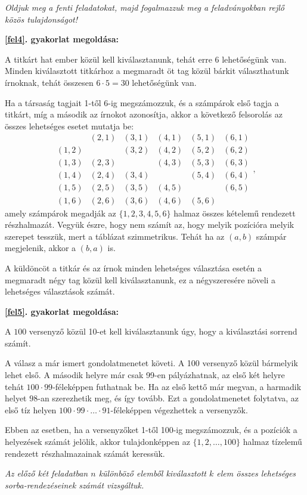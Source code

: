 \textit{Oldjuk meg a fenti feladatokat, majd fogalmazzuk meg a feladványokban
rejlő közös tulajdonságot!}
\begin{solution}
{\bf\ref{fel4}. gyakorlat megoldása:}

A titkárt hat ember közül kell kiválasztanunk, tehát erre 6 lehetőségünk
van. Minden kiválasztott titkárhoz a megmaradt öt tag közül bárkit
választhatunk írnoknak, tehát összesen $6\cdot5=30$ lehetőségünk
van.

Ha a társaság tagjait 1-től 6-ig megszámozzuk, és a számpárok első
tagja a titkárt, míg a második az írnokot azonosítja, akkor a következő
felsorolás az összes lehetséges esetet mutatja be: 
\[
\begin{array}{cccccc}
 & (2,1) & (3,1) & (4,1) & (5,1) & (6,1)\\
(1,2) &  & (3,2) & (4,2) & (5,2) & (6,2)\\
(1,3) & (2,3) &  & (4,3) & (5,3) & (6,3)\\
(1,4) & (2,4) & (3,4) &  & (5,4) & (6,4)\\
(1,5) & (2,5) & (3,5) & (4,5) &  & (6,5)\\
(1,6) & (2,6) & (3,6) & (4,6) & (5,6)
\end{array},
\]
amely számpárok megadják az $\{1,2,3,4,5,6\}$ halmaz összes kételemű
rendezett részhalmazát. Vegyük észre, hogy nem számít az, hogy melyik
pozícióra melyik szerepet tesszük, mert a táblázat szimmetrikus. Tehát
ha az $(a,b)$ számpár megjelenik, akkor a $(b,a)$ is.

A küldöncöt a titkár és az írnok minden lehetséges választása esetén
a megmaradt négy tag közül kell kiválasztanunk, ez a négyszeresére
növeli a lehetséges választások számát.

{\bf\ref{fel5}. gyakorlat megoldása:}

A $100$ versenyző közül 10-et kell kiválasztanunk úgy, hogy a kiválasztási
sorrend számít.

A válasz a már ismert gondolatmenetet követi. A 100 versenyző közül
bármelyik lehet első. A második helyre már csak 99-en pályázhatnak,
az első két helyre tehát $100\cdot99$-féleképpen futhatnak be. Ha
az első kettő már megvan, a harmadik helyet $98$-an szerezhetik meg,
és így tovább. Ezt a gondolatmenetet folytatva, az első tíz helyen
$100\cdot99\cdot\ldots\cdot91$-féleképpen végezhettek a versenyzők.

Ebben az esetben, ha a versenyzőket 1-től 100-ig megszámozzuk, és
a pozíciók a helyezések számát jelölik, akkor tulajdonképpen az $\{1,2,\ldots,100\}$
halmaz tízelemű rendezett részhalmazainak számát keressük. 
\end{solution}
\textit{Az előző két feladatban $n$ különböző elemből kiválasztott
$k$ elem összes lehetséges sorba-rendezéseinek számát vizsgáltuk.}

